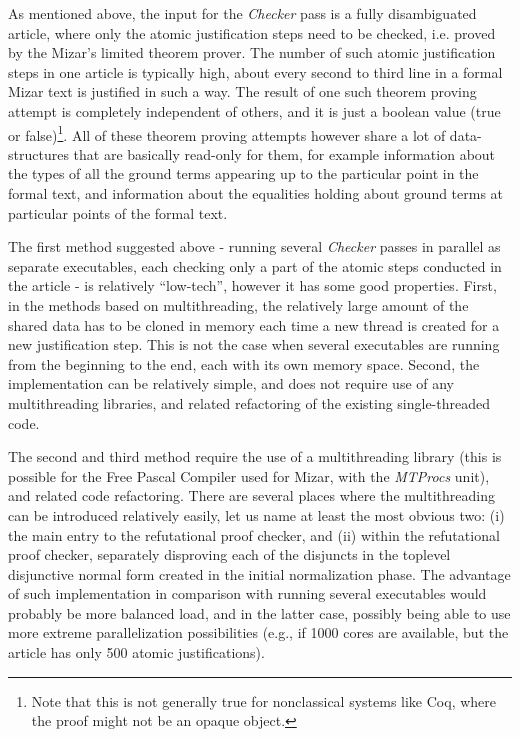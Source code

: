 \documentclass{llncs}
\begin{document}
As mentioned above, the input for the \emph{Checker} pass is a fully
disambiguated article, where only the atomic justification steps need
to be checked, i.e. proved by the Mizar's limited theorem prover. The
number of such atomic justification steps in one article is typically
high, about every second to third line in a formal Mizar text is
justified in such a way.  The result of one such theorem proving attempt
is completely independent of others, and it is just a boolean value
(true or false)\footnote{Note that this is not generally true for
  nonclassical systems like Coq, where the proof might not be an
  opaque object.}. All of these theorem proving attempts however share
a lot of data-structures that are basically read-only for them, for
example information about the types of all the ground terms appearing
up to the particular point in the formal text, and information about
the equalities holding about ground terms at particular points of the
formal text.

The first method suggested above - running several \emph{Checker}
passes in parallel as separate executables, each checking only a part
of the atomic steps conducted in the article - is relatively
``low-tech'', however it has some good properties. First, in the
methods based on multithreading, the relatively large amount of the
shared data has to be cloned in memory each time a new thread is
created for a new justification step. This is not the case when
several executables are running from the beginning to the end, each
with its own memory space. Second, the implementation can be
relatively simple, and does not require use of any multithreading
libraries, and related refactoring of the existing single-threaded
code.

The second and third method require the use of a multithreading
library (this is possible for the Free Pascal Compiler used for Mizar,
with the \emph{MTProcs} unit), and related code refactoring. There are
several places where the multithreading can be introduced relatively
easily, let us name at least the most obvious two: (i) the main entry
to the refutational proof checker, and (ii) within the refutational
proof checker, separately disproving each of the disjuncts in the
toplevel disjunctive normal form created in the initial normalization
phase. The advantage of such implementation in comparison with running
several executables would probably be more balanced load, and in the
latter case, possibly being able to use more extreme parallelization
possibilities (e.g., if 1000 cores are available, but the article has
only 500 atomic justifications).
\end{document}
